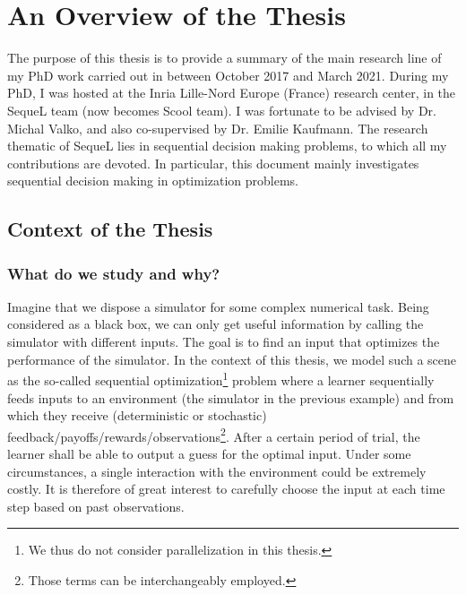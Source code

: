 \chapter{An Overview of the Thesis}\label{chap:intro}
	\minitoc
	\newpage





The purpose of this thesis is to provide a summary of the main research line of my PhD work carried out in between October 2017 and March 2021. During my PhD, I was hosted at the Inria Lille-Nord Europe (France) research center, in the SequeL team (now becomes Scool team). I was fortunate to be advised by Dr. Michal Valko, and also co-supervised by Dr. Emilie Kaufmann. The research thematic of SequeL lies in sequential decision making problems, to which all my contributions are devoted. In particular, this document mainly investigates sequential decision making in optimization problems.

\section{Context of the Thesis}\label{sec:intro.context}
	
\subsection{What do we study and why?}\label{sec:intro.context.what}

Imagine that we dispose a simulator for some complex numerical task. Being considered as a black box, we can only get useful information by calling the simulator with different inputs. The goal is to find an input that optimizes the performance of the simulator. In the context of this thesis, we model such a scene as the so-called \gls{sequential optimization}\footnote{We thus do not consider parallelization in this thesis.} problem where a learner sequentially feeds inputs to an environment (the simulator in the previous example) and from which they receive (deterministic or stochastic) feedback/payoffs/rewards/observations\footnote{Those terms can be interchangeably employed.}. After a certain period of trial, the learner shall be able to output a guess for the optimal input. Under some circumstances, a single interaction with the environment could be extremely costly. It is therefore of great interest to carefully choose the input at each time step based on past observations.


